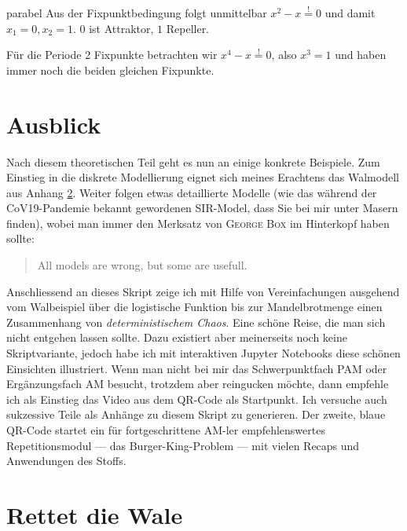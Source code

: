 \documentclass[%
<<<<<<< Updated upstream
11pt,%
twoside,%
titlepage,%
german,%
headsepline%
]{scrartcl}
\begin{document}
\begin{lsg}{parabel}
    Aus der Fixpunktbedingung folgt unmittelbar $x^2-x\stackrel{!}{=}0$ und damit $x_1=0, x_2=1$. $0$ ist Attraktor, $1$ Repeller.

    Für die Periode 2 Fixpunkte betrachten wir $x^4-x\stackrel{!}{=}0$, also $x^3=1$ und haben immer noch die beiden gleichen Fixpunkte.
\end{lsg}

\clearpage

\section{Ausblick}

Nach
diesem theoretischen Teil geht es nun an einige konkrete Beispiele. Zum Einstieg in die diskrete Modellierung eignet sich meines Erachtens das Walmodell aus Anhang \ref{anhang:wale}. Weiter folgen etwas detaillierte Modelle (wie das während der CoV19-Pandemie bekannt gewordenen SIR-Model, dass Sie bei mir unter Masern finden), wobei man immer den Merksatz von \textsc{George Box} im Hinterkopf haben sollte:

\begin{quote}
    All models are wrong, but some are usefull.
\end{quote}

Anschliessend
an dieses Skript zeige ich mit Hilfe von Vereinfachungen ausgehend vom Walbeispiel über die logistische Funktion bis zur Mandelbrotmenge einen Zusammenhang von \emph{deterministischem Chaos}. Eine schöne Reise, die man sich nicht entgehen lassen sollte. Dazu existiert aber meinerseits noch keine Skriptvariante, jedoch habe ich mit interaktiven Jupyter Notebooks diese schönen Einsichten illustriert. Wenn man nicht bei mir das Schwerpunktfach PAM oder Ergänzungsfach AM besucht, trotzdem aber reingucken möchte, dann empfehle ich als Einstieg das Video aus dem QR-Code als Startpunkt. Ich versuche auch sukzessive Teile als Anhänge zu diesem Skript zu generieren. Der
zweite, blaue QR-Code startet ein für fortgeschrittene AM-ler empfehlenswertes Repetitionsmodul --- das Burger-King-Problem --- mit vielen Recaps und Anwendungen des Stoffs.

\clearpage

\appendix

\section{Rettet die Wale}\label{anhang:wale}
\end{document}
